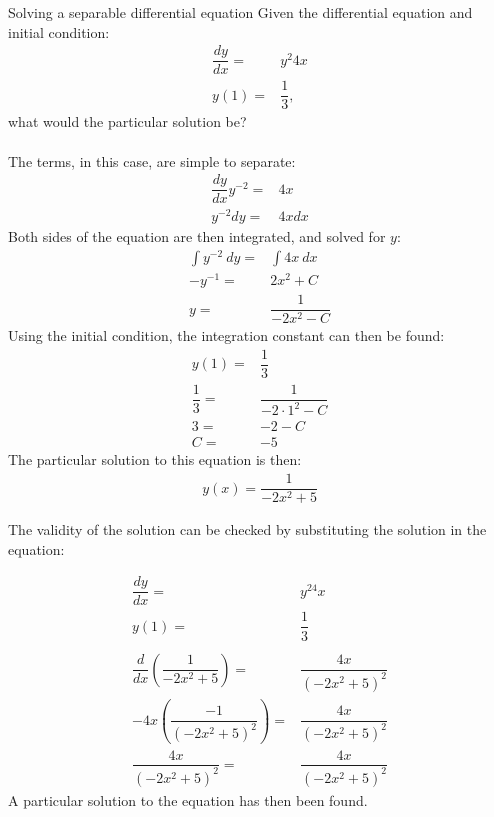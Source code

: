 \begin{example}{Solving a separable differential equation}{}
Given the differential equation and initial condition:
\begin{align*}
	\dfrac{dy}{dx} =& y^2 4x \\
	y(1) =& \dfrac{1}{3},
\end{align*}
what would the particular solution be?
\\ \\
The terms, in this case, are simple to separate: 
\begin{align*}
	\dfrac{dy}{dx} y^{-2} =& 4x \\
	y^{-2} dy =& 4x dx 
\end{align*}
Both sides of the equation are then integrated, and solved for $y$:
\begin{align*}
	\int{y^{-2}\ dy} =& \int{4x\  dx} \\
	-y^{-1} =& 2x^2 +C \\
	y =& \dfrac{1}{-2x^2-C}
\end{align*}
Using the initial condition, the integration constant can then be found:
\begin{align*}
	y(1) =& \dfrac{1}{3} \\
	\dfrac{1}{3} =& \dfrac{1}{-2 \cdot 1^2-C} \\
	3 =& -2-C \\
	C =& -5
\end{align*}
The particular solution to this equation is then:
\begin{align*}
	y(x) = \dfrac{1}{-2x^2+5}
\end{align*}

The validity of the solution can be checked by substituting the solution in the equation:


\begin{align*}
	\dfrac{dy}{dx} =& y^24x \\
	y(1) =& \dfrac{1}{3}  \\
	\\
	\dfrac{d}{dx} \left(\dfrac{1}{-2x^2+5}\right) =& \dfrac{4x}{(-2x^2+5)^2} \\
	-4x\left(\dfrac{-1}{(-2x^2+5)^2}\right)  =& \dfrac{4x}{(-2x^2+5)^2} \\
	\dfrac{4x}{(-2x^2+5)^2} =& \dfrac{4x}{(-2x^2+5)^2}
\end{align*}
A particular solution to the equation has then been found.
\end{example}
